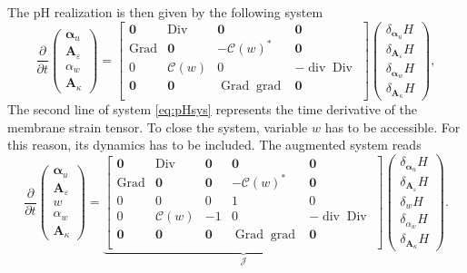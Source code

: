 \documentclass{ifacconf}
\DeclareMathOperator*{\grad}{grad}
\DeclareMathOperator*{\Grad}{Grad}
\DeclareMathOperator*{\Div}{Div}
\renewcommand{\div}{\operatorname{div}}
\begin{document}
The pH realization is then given by the following system
\begin{equation}\label{eq:pHsys}
	\frac{\partial}{\partial t}
	\begin{pmatrix}
		\bm{\alpha}_u \\
		\bm{A}_\varepsilon \\
		\alpha_w \\
		\bm{A}_\kappa
	\end{pmatrix} = 
	\begin{bmatrix}
		\bm{0} & \Div & \bm{0} & \bm{0} \\
		\Grad & \bm{0} & -\mathcal{C}(w)^* & \bm{0} \\
		0 & \mathcal{C}(w) & 0 & -\div\Div \\
		\bm{0} & \bm{0} & \Grad\grad & \bm{0} \\ 
	\end{bmatrix}
	\begin{pmatrix}
		\delta_{\bm\alpha_u} H \\
		\delta_{\bm{A}_\varepsilon} H \\
		\delta_{\bm\alpha_w} H \\
		\delta_{\bm{A}_\kappa} H
	\end{pmatrix},
\end{equation}
The second line of system \eqref{eq:pHsys} represents the time derivative of the membrane strain tensor. To close the system, variable $w$ has to be accessible. For this reason, its dynamics has to be included. The augmented system reads
\begin{equation}\label{eq:pHsys_aug}
	\frac{\partial}{\partial t}
	\begin{pmatrix}
		\bm{\alpha}_u \\
		\bm{A}_\varepsilon \\
		w \\
		\alpha_w \\
		\bm{A}_\kappa
	\end{pmatrix} = 
	\underbrace{\begin{bmatrix}
			\bm{0} & \Div & \bm{0} & \bm{0} & \bm{0}\\
			\Grad & \bm{0} & \bm{0} & -\mathcal{C}(w)^* & \bm{0} \\
			0 & 0 & 0 & 1 & 0 \\
			0 & \mathcal{C}(w) & -1 & 0 & -\div\Div \\
			\bm{0} & \bm{0} & \bm{0} & \Grad\grad & \bm{0} \\ 
	\end{bmatrix}}_{\mathcal{J}}
	\begin{pmatrix}
		\delta_{\bm\alpha_u} H \\
		\delta_{\bm{A}_\varepsilon} H \\
		\delta_{w} H \\
		\delta_{\alpha_w} H \\
		\delta_{\bm{A}_\kappa} H
	\end{pmatrix}.
\end{equation}
\end{document}
